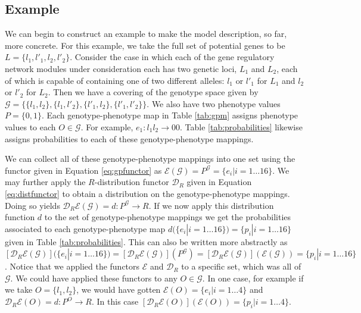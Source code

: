\documentclass[10pt]{article}
\begin{document}
\subsection*{Example}
We can begin to construct an example to make the model description, so far, more concrete. For this example, we take the full set of potential genes to be $L = \{ l_1,l'_1,l_2,l'_2 \}$. Consider the case in which each of the gene regulatory network modules under consideration each has two genetic loci, $L_1$ and $L_2$, each of which is capable of containing one of two different alleles: $l_1$ or $l'_1$ for $L_1$ and $l_2$ or $l'_2$ for $L_2$. Then we have a covering of the genotype space given by $\mathcal{G} = \{\{l_1,l_2 \},\{l_1,l'_2 \},\{l'_1,l_2\},\{l'_1,l'_2\} \}$. We also have two phenotype values $P = \{0, 1\}$. Each genotype-phenotype map in Table \ref{tab:gpm} assigns phenotype values to each $O \in \mathcal{G}$. For example, $e_1 \colon	l_1 l_2 \rightarrow 00$. Table \ref{tab:probabilities} likewise assigns probabilities to each of these genotype-phenotype mappings.

We can collect all of these genotype-phenotype mappings into one set using the functor given in Equation \ref{eq:gpfunctor} as $\mathcal{E}(\mathcal{G}) = P^{\mathcal{G}} = \{e_i | i=1 \ldots 16 \}$. We may further apply the $R$-distribution functor $\mathcal{D}_R$ given in Equation \ref{eq:distfunctor} to obtain a distribution on the genotype-phenotype mappings. Doing so yields  $\mathcal{D}_R\mathcal{E}(\mathcal{G})=d \colon P^\mathcal{G} \rightarrow R$. If we now apply this distribution function $d$ to the set of genotype-phenotype mappings we get the probabilities associated to each genotype-phenotype map $d(\{e_i | i=1 \ldots 16 \}) = \{p_i|i=1 \ldots 16\}$ given in Table \ref{tab:probabilities}. This can also be written more abstractly as $\left[\mathcal{D}_R\mathcal{E}(\mathcal{G})\right](\{e_i | i=1 \ldots 16 \}) = \left[\mathcal{D}_R\mathcal{E}(\mathcal{G})\right](P^\mathcal{G}) = \left[\mathcal{D}_R\mathcal{E}(\mathcal{G})\right](\mathcal{E}(\mathcal{G})) = \{p_i|i=1 \ldots 16\}$. Notice that we applied the functors $\mathcal{E}$ and $\mathcal{D}_R$ to a specific set, which was all of $\mathcal{G}$. We could have applied these functors to any $O \in \mathcal{G}$. In one case, for example if we take $O = \{l_1, l_2\}$, we would have gotten $\mathcal{E}(O) = \{e_i|i=1 \ldots 4\}$ and $\mathcal{D}_R\mathcal{E}(O) = d \colon P^O \rightarrow R$. In this case $\left[\mathcal{D}_R\mathcal{E}(O)\right](\mathcal{E}(O)) = \{p_i|i=1 \ldots 4\}$.
\end{document}
